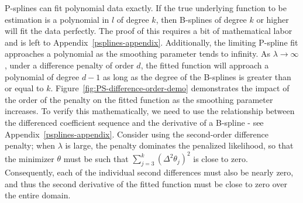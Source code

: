 P-splines can fit polynomial data exactly. If the true underlying function to be estimation is a polynomial in $l$ of degree $k$, then B-splines of degree $k$ or higher will fit the data perfectly. The proof of this requires a bit of mathematical labor and is left to Appendix~\ref{psplines-appendix}. Additionally, the limiting P-spline fit approaches a polynomial as the smoothing parameter tends to infinity.  As $\lambda \rightarrow \infty$, under a difference penalty of order $d$, the fitted function will approach a polynomial of degree $d-1$ as long as the degree of the B-splines is greater than or equal to $k$. Figure~\ref{fig:PS-difference-order-demo} demonstrates the impact of the order of the penalty on the fitted function as the smoothing parameter increases. To verify this mathematically, we need to use the relationship between the differenced coefficient sequence and the derivative of a B-spline - see Appendix~\ref{psplines-appendix}. Consider using the second-order difference penalty; when $\lambda$ is large, the penalty dominates the penalized likelihood, so that the minimizer $\theta$ must be such that $\sum_{j=3}^k\left(\Delta^2\theta_j\right)^2$ is close to zero. Consequently, each of the individual second differences must also be nearly zero, and thus the second derivative of the fitted function must be close to zero over the entire domain.

